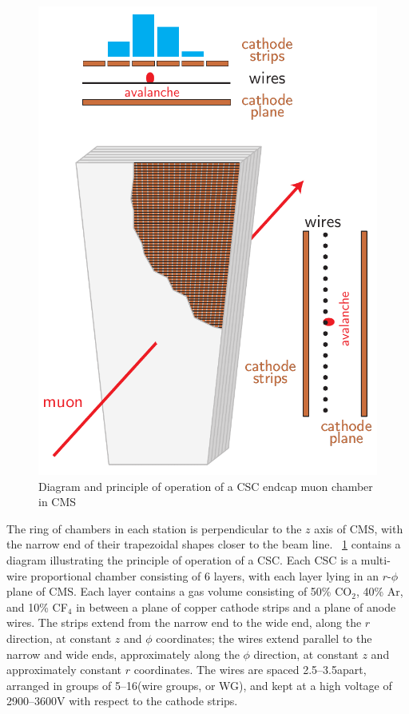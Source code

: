 \begin{figure}[p]
	\centering
	\includegraphics[width=\dummyFigWidth]{figures/neutron/fig_CSC.pdf}
	\caption{Diagram and principle of operation of a CSC endcap muon chamber in CMS}
	\label{fig:CSC}
\end{figure}

The ring of chambers in each station is perpendicular to the $z$ axis of CMS, with the narrow end of their trapezoidal shapes closer to the beam line. \Fig~\ref{fig:CSC} contains a diagram illustrating the principle of operation of a CSC. Each CSC is a multi-wire proportional chamber consisting of 6 layers, with each layer lying in an $r$-$\phi$ plane of CMS. Each layer contains a gas volume consisting of 50\% CO$_2$, 40\% Ar, and 10\% CF$_4$ in between a plane of copper cathode strips and a plane of anode wires. The strips extend from the narrow end to the wide end, along the $r$ direction, at constant $z$ and $\phi$ coordinates; the wires extend parallel to the narrow and wide ends, approximately along the $\phi$ direction, at constant $z$ and approximately constant $r$ coordinates. The wires are spaced 2.5--3.5\mm apart, arranged in groups of 5--16\mm (wire groups, or WG), and kept at a high voltage of 2900--3600\unit{V} with respect to the cathode strips. 

